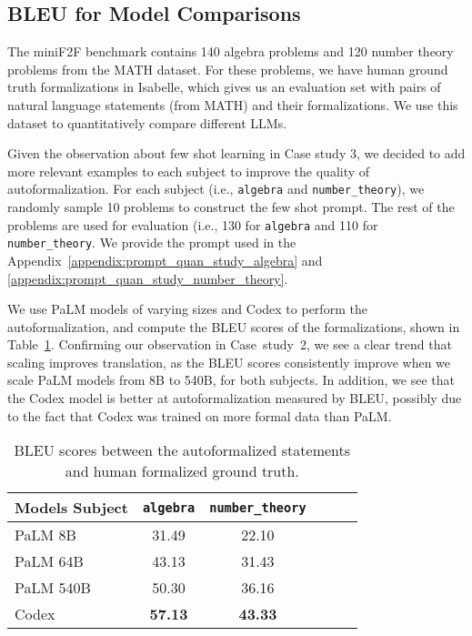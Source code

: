 \documentclass{article}
\begin{document}
\subsection{BLEU for Model Comparisons}
\label{sec:bleu}
The miniF2F benchmark contains 140 algebra problems and 120 number theory problems from the MATH dataset. For these problems, we have human ground truth formalizations in Isabelle, which gives us an evaluation set with pairs of natural language statements (from MATH) and their formalizations. We use this dataset to quantitatively compare different LLMs.

Given the observation about few shot learning in Case study 3, we decided to add more relevant examples to each subject to improve the quality of autoformalization. For each subject (i.e., \texttt{algebra} and \texttt{number\_theory}), we randomly sample 10 problems to construct the few shot prompt. The rest of the problems are used for evaluation (i.e., 130 for \texttt{algebra} and 110 for \texttt{number\_theory}. We provide the prompt used in the Appendix~\ref{appendix:prompt_quan_study_algebra} and \ref{appendix:prompt_quan_study_number_theory}.

We use PaLM models of varying sizes and Codex to perform the autoformalization, and compute the BLEU scores of the formalizations, shown in Table~\ref{tab:bleu}. Confirming our observation in Case~study~2, we see a clear trend that scaling improves translation, as the BLEU scores consistently improve when we scale PaLM models from 8B to 540B, for both subjects. In addition, we see that the Codex model is better at autoformalization measured by BLEU, possibly due to the fact that Codex was trained on more formal data than PaLM.

\begin{table}[t]
  
  \caption{BLEU scores between the autoformalized statements and human formalized ground truth.}
  \label{tab:bleu}
  \centering
  \begin{tabular}{lccccc}
    \toprule
    Models  Subject   & \texttt{algebra} & \texttt{number\_theory}  \\ 
    \midrule
    PaLM 8B    &  31.49 &  22.10\\
    PaLM 64B    &  43.13&  31.43 \\
    PaLM 540B    &  50.30& 36.16 \\
    Codex &   \textbf{57.13}  & \textbf{43.33}  \\
    \bottomrule
  \end{tabular}
\end{table}
\end{document}
